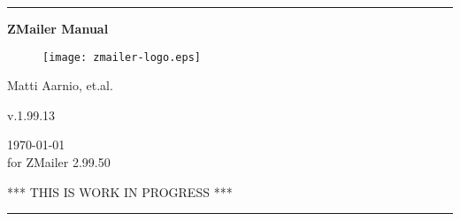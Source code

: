 \documentclass[twoside,twocolumn,a4paper,draft]{book}
\newcommand{\ZMailerManual}{ZMailer Manual}
\newcommand{\ZManVersion}{v.1.99.13}
\begin{document}
\startdocument

\begin{titlepage}
\rule{\textwidth}{1mm}
\begin{center}
\bf
\Huge
\vspace{2ex}
\ZMailerManual \\
\vspace{2ex}

\begin{htmlonly}
\end{htmlonly}

\begin{figure}[h]
  \texttt{[image: zmailer-logo.eps]}
\end{figure}
\vspace{2ex}

\Large
Matti Aarnio, et.al. \\
\vspace{2ex}
\begin{htmlonly}
\vspace{1ex}
\end{htmlonly}
\ZManVersion \\
\date \\
\today \\
for ZMailer 2.99.50 \\
\vspace{2ex}
\begin{htmlonly}
\vspace{1ex}
\end{htmlonly}
\Large
\sf
*** THIS IS WORK IN PROGRESS ***
\end{center}
\vfill
\rule{\textwidth}{1mm}
\end{titlepage}

\cleardoublepage


%
\end{document}
